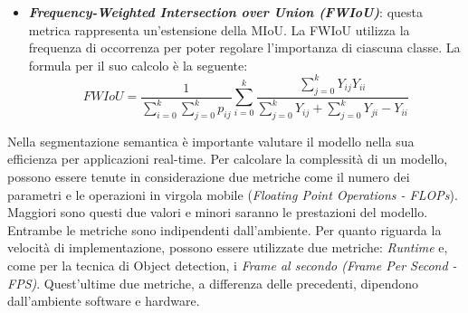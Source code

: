 \begin{itemize}
    \item {\bfseries{\emph{Frequency-Weighted Intersection over Union (FWIoU)}}}: questa metrica 
    rappresenta un’estensione della MIoU. La FWIoU utilizza la frequenza 
    di occorrenza per poter regolare l’importanza di ciascuna classe. La formula 
    per il suo calcolo è la seguente:
    \begin{equation}
        FWIoU = \frac{1}{\sum_{i=0}^k\sum_{j=0}^kp_{ij}}\sum_{i=0}^k\frac{\sum_{j=0}^kY_{ij}Y_{ii}}{\sum_{j=0}^kY_{ij}+\sum_{j=0}^kY_{ji}-Y_{ii}}
    \end{equation}
\end{itemize}
Nella segmentazione semantica è importante valutare il modello nella sua efficienza 
per applicazioni real-time. Per calcolare la complessità di un modello, possono 
essere tenute in considerazione due metriche come il numero dei parametri e le 
operazioni in virgola mobile (\emph{Floating Point Operations - FLOPs}). Maggiori 
sono questi due valori e minori saranno le prestazioni del modello. Entrambe 
le metriche sono indipendenti dall’ambiente. Per quanto riguarda la velocità di 
implementazione, possono essere utilizzate due metriche: \emph{Runtime} e, come per 
la tecnica di Object detection, i \emph{Frame al secondo (Frame Per Second - FPS)}. 
Quest’ultime due metriche, a differenza delle precedenti, dipendono dall’ambiente 
software e hardware.

